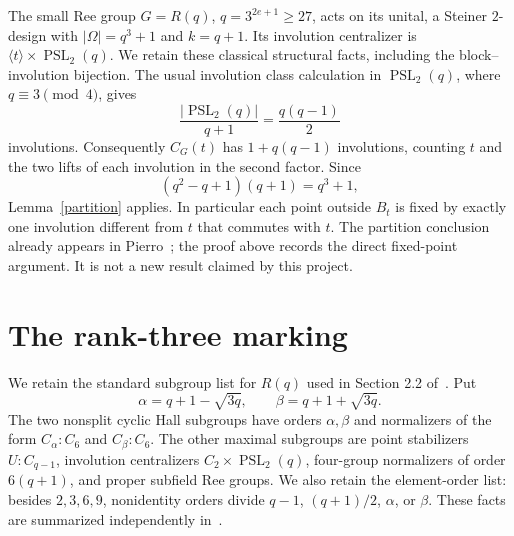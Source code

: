 \documentclass[11pt,a4paper]{article}
\newcommand{\gen}[1]{\langle #1\rangle}
\begin{document}
The small Ree group $G=R(q)$, $q=3^{2e+1}\ge27$, acts on its unital,
a Steiner $2$-design with $|\Omega|=q^3+1$ and $k=q+1$. Its involution
centralizer is $\gen t\times\operatorname{PSL}_2(q)$. We retain these
classical structural facts, including the block--involution bijection.
The usual involution class calculation in $\operatorname{PSL}_2(q)$,
where $q\equiv3\pmod4$, gives
\[
 \frac{|\operatorname{PSL}_2(q)|}{q+1}=\frac{q(q-1)}2
\]
involutions. Consequently $C_G(t)$ has $1+q(q-1)$ involutions, counting
$t$ and the two lifts of each involution in the second factor. Since
\[
 (q^2-q+1)(q+1)=q^3+1,
\]
Lemma~\ref{partition} applies. In particular each point outside $B_t$
is fixed by exactly one involution different from $t$ that commutes
with $t$. The partition conclusion already appears in
Pierro~\cite[Lemma 2.2 and the following paragraph]{Pierro}; the proof
above records the direct fixed-point argument. It is not a new result
claimed by this project.

\section{The rank-three marking}
We retain the standard subgroup list for $R(q)$ used in Section 2.2
of~\cite{LSV}. Put
\[
 \alpha=q+1-\sqrt{3q},\qquad \beta=q+1+\sqrt{3q}.
\]
The two nonsplit cyclic Hall subgroups have orders $\alpha,\beta$ and
normalizers of the form $C_\alpha:C_6$ and $C_\beta:C_6$.
The other maximal subgroups are point stabilizers $U:C_{q-1}$,
involution centralizers $C_2\times\operatorname{PSL}_2(q)$, four-group
normalizers of order $6(q+1)$, and proper subfield Ree groups.
We also retain the element-order list: besides $2,3,6,9$, nonidentity
orders divide $q-1$, $(q+1)/2$, $\alpha$, or $\beta$.
These facts are summarized independently in~\cite[Section 2, Tables 1--3]{Pierro}.
\end{document}
